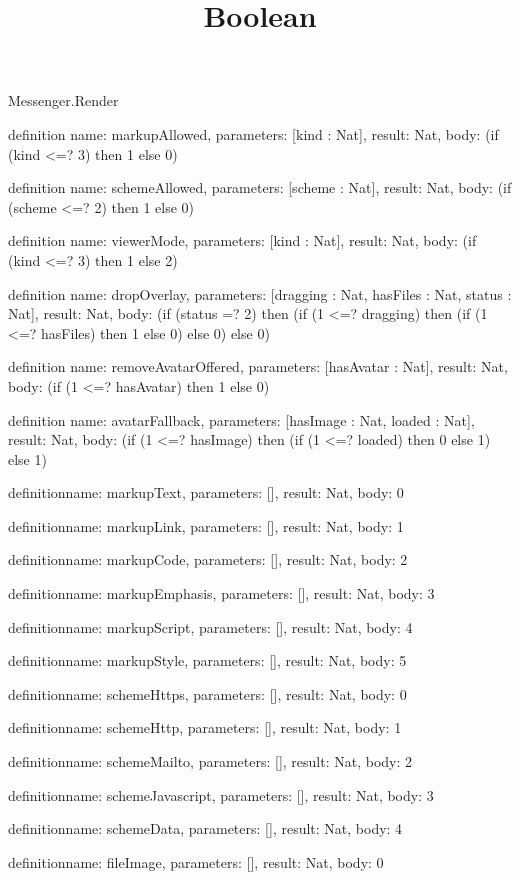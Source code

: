 \begin{lexlean}{Messenger.Render}
\title{Boolean}
\begin{semanticmodule}
definition{
  name: markupAllowed,
  parameters: [kind : Nat],
  result: Nat,
  body: (if (kind <=? 3) then 1 else 0)
}

definition{
  name: schemeAllowed,
  parameters: [scheme : Nat],
  result: Nat,
  body: (if (scheme <=? 2) then 1 else 0)
}

definition{
  name: viewerMode,
  parameters: [kind : Nat],
  result: Nat,
  body: (if (kind <=? 3) then 1 else 2)
}

definition{
  name: dropOverlay,
  parameters: [dragging : Nat, hasFiles : Nat, status : Nat],
  result: Nat,
  body: (if (status =? 2) then (if (1 <=? dragging) then (if (1 <=? hasFiles) then 1 else 0) else 0) else 0)
}

definition{
  name: removeAvatarOffered,
  parameters: [hasAvatar : Nat],
  result: Nat,
  body: (if (1 <=? hasAvatar) then 1 else 0)
}

definition{
  name: avatarFallback,
  parameters: [hasImage : Nat, loaded : Nat],
  result: Nat,
  body: (if (1 <=? hasImage) then (if (1 <=? loaded) then 0 else 1) else 1)
}

definition{name: markupText, parameters: [], result: Nat, body: 0}

definition{name: markupLink, parameters: [], result: Nat, body: 1}

definition{name: markupCode, parameters: [], result: Nat, body: 2}

definition{name: markupEmphasis, parameters: [], result: Nat, body: 3}

definition{name: markupScript, parameters: [], result: Nat, body: 4}

definition{name: markupStyle, parameters: [], result: Nat, body: 5}

definition{name: schemeHttps, parameters: [], result: Nat, body: 0}

definition{name: schemeHttp, parameters: [], result: Nat, body: 1}

definition{name: schemeMailto, parameters: [], result: Nat, body: 2}

definition{name: schemeJavascript, parameters: [], result: Nat, body: 3}

definition{name: schemeData, parameters: [], result: Nat, body: 4}

definition{name: fileImage, parameters: [], result: Nat, body: 0}


\end{semanticmodule}
\end{lexlean}
